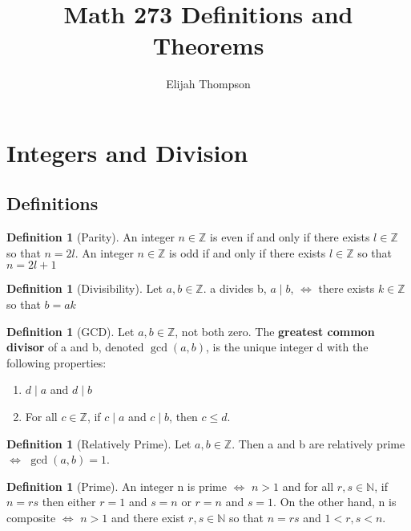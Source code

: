 \documentclass[12pt]{article}
\theoremstyle{definition}
\newtheorem{defn}[thm]{Definition}
\theoremstyle{remark}
\numberwithin{equation}{section}
\newcommand\Z{\mathbb Z}    %
\newcommand\N{\mathbb N}    %
\begin{document}

\title{Math 273 Definitions and Theorems}
\author{Elijah Thompson}
\maketitle

\tableofcontents



\section{Integers and Division}

\subsection{Definitions}


\begin{defn}[Parity]
        An integer $n \in \Z$ is even if and only if there exists $l \in \Z$ so that $n = 2l$. An integer $n \in \Z$ is odd if and only if there exists $l \in \Z$ so that $n = 2l + 1$
\end{defn}

\begin{defn}[Divisibility]
        Let $a,b \in \Z$.
        a divides b, $a\;\vert\;b$, $\iff$ there exists $k \in \Z$ so that $b = ak$
\end{defn}


\begin{defn}[GCD]
        Let $a,b \in \Z$, not both zero. The \textbf{greatest common divisor} of a and b, denoted $\gcd(a,b)$, is the unique integer d with the following properties:
        \begin{enumerate}
                \item $d\;\vert\;a$ and $d\;\vert\;b$
                \item For all $c \in \Z$, if $c\;\vert\;a$ and $c\;\vert\;b$, then $c \leq d$.
        \end{enumerate}
\end{defn}


\begin{defn}[Relatively Prime]
        Let $a,b \in \Z$. Then a and b are relatively prime $\iff$ $\gcd(a,b) = 1$.
\end{defn}


\begin{defn}[Prime]
        An integer n is prime $\iff$ $n > 1$ and for all $r,s \in \N$, if $n = rs$ then either $r = 1$ and $s = n$ or $r = n$ and $s= 1$. On the other hand, n is composite $\iff$ $n > 1$ and there exist $r,s \in \N$ so that $n = rs$ and $1 < r,s < n$.
\end{defn}
\end{document}
